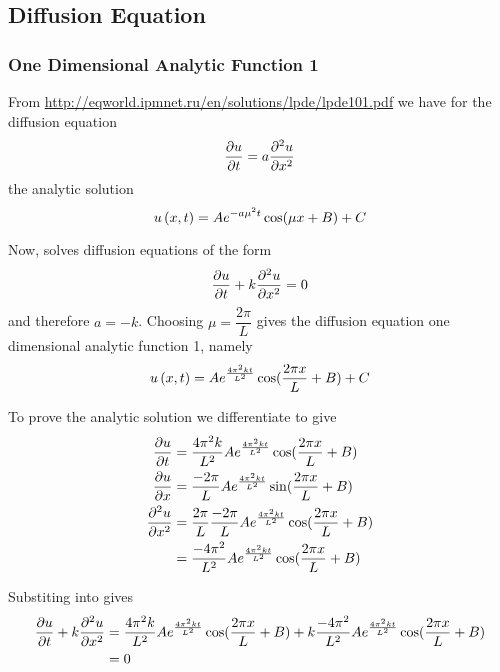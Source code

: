 \subsection{Diffusion Equation} 

\subsubsection{One Dimensional Analytic Function 1}

From \url{http://eqworld.ipmnet.ru/en/solutions/lpde/lpde101.pdf} we have for the \oned diffusion equation
\begin{equation}
   \dfrac{\partial u}{\partial t} =a \dfrac{\partial^{2} u}{\partial {x}^{2}} 
\end{equation}
the analytic solution
\begin{equation}
   u\left( x,t \right) =Ae^{-a\mu^{2}t}\cos(\mu x + B) + C
\end{equation}

Now, \OpenCMISS solves diffusion equations of the form
\begin{equation}
  \delby{u}{t}+k\deltwosqby{u}{x}=0
  \label{eqn:OpenCMISSDiffusionEquationOneDim}
\end{equation}
and therefore $a=-k$. Choosing $\mu=\dfrac{2\pi}{L}$ gives the
\OpenCMISS diffusion equation one dimensional analytic function 1, namely
\begin{equation}
  \fnof{u}{x,t}=Ae^{\frac{4\pi^{2}kt}{L^{2}}}\cos(\frac{2\pi x}{L} + B) + C
  \label{eqn:AnalyticDiffusionEquationOneDim1}
\end{equation}

To prove the analytic solution we differentiate
 to give
\begin{align}
    \delby{u}{t} &=
    \dfrac{4\pi^{2}k}{L^{2}}Ae^{\frac{4\pi^{2}kt}{L^{2}}}\cos(\frac{2\pi x}{L} + B) \\
    \delby{u}{x} &=
    \dfrac{-2\pi}{L}Ae^{\frac{4\pi^{2}kt}{L^{2}}}\sin(\frac{2\pi x}{L} + B) \\
    \deltwosqby{u}{x} &=
    \dfrac{2\pi}{L}\dfrac{-2\pi}{L}Ae^{\frac{4\pi^{2}kt}{L^{2}}}\cos(\frac{2\pi x}{L} + B) \\
    & = \dfrac{-4\pi^{2}}{L^{2}}Ae^{\frac{4\pi^{2}kt}{L^{2}}}\cos(\frac{2\pi x}{L} + B)
  \label{eqn:AnalyticDiffusionEquationOneDim1Derivatives}
\end{align}

Substiting  into  gives
\begin{align}
   \dfrac{\partial u}{\partial t} +k \dfrac{\partial^{2} u}{\partial {x}^{2}}  &=
  \dfrac{4\pi^{2}k}{L^{2}}Ae^{\frac{4\pi^{2}kt}{L^{2}}}\cos(\frac{2\pi x}{L}
  + B) +
  k\dfrac{-4\pi^{2}}{L^{2}}Ae^{\frac{4\pi^{2}kt}{L^{2}}}\cos(\frac{2\pi x}{L}
  + B) \\
  &= 0
\end{align}

